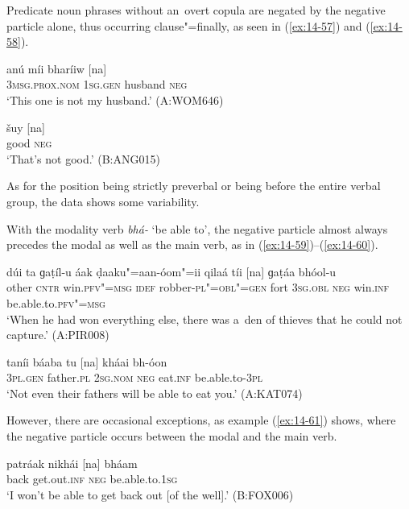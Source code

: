 Predicate noun phrases without an~overt copula are negated by the negative particle alone, thus occurring clause"=finally, as seen in (\ref{ex:14-57}) and (\ref{ex:14-58}).

\begin{exe}
\ex
\label{ex:14-57}
\gll anú míi bharíiw [na] \\
\textsc{3msg.prox.nom} \textsc{1sg.gen} husband \textsc{neg} \\
\glt `This one is not my husband.' (A:WOM646)

\ex
\label{ex:14-58}
\gll šuy [na] \\
good \textsc{neg} \\
\glt `That's not good.' (B:ANG015)
\end{exe}

As for the position being strictly preverbal or being before the entire verbal group, the data shows some variability. 


With the modality verb \textit{bhá-} `be able to', the negative particle almost always precedes the modal as well as the main verb, as in (\ref{ex:14-59})--(\ref{ex:14-60}).

\begin{exe}
\ex
\label{ex:14-59}
\gll dúi ta ɡaṭíl-u áak ḍaaku"=aan-óom"=ii qilaá tíi [na] ɡaṭáa bhóol-u \\
other \textsc{cntr} win.\textsc{pfv"=msg} \textsc{idef} robber-\textsc{pl"=obl"=gen} fort  \textsc{3sg.obl} \textsc{neg} win.\textsc{inf} be.able.to.\textsc{pfv"=msg}  \\
\glt `When he had won everything else, there was a~den of thieves that he could not capture.' (A:PIR008)

\ex
\label{ex:14-60}
\gll taníi báaba tu [na] kháai bh-óon \\
\textsc{3pl.gen} father.\textsc{pl} \textsc{2sg.nom} \textsc{neg} eat.\textsc{inf} be.able.to-\textsc{3pl} \\
\glt `Not even their fathers will be able to eat you.' (A:KAT074)
\end{exe}

However, there are occasional exceptions, as example (\ref{ex:14-61}) shows, where the negative particle occurs between the modal and the main verb.

\begin{exe}
\ex
\label{ex:14-61}
\gll patráak nikhái [na] bháam \\
back get.out.\textsc{inf} \textsc{neg} be.able.to.\textsc{1sg} \\
\glt `I won't be able to get back out [of the well].' (B:FOX006)
\end{exe}


